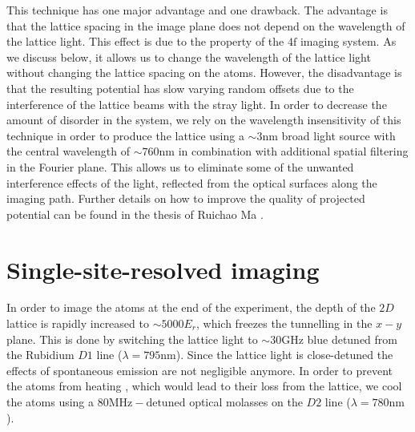 This technique has one major advantage and one drawback. The advantage is that the lattice spacing in the image plane does not depend on the wavelength of the lattice light. This effect is due to the property of the $4\mathrm{f}$ imaging system. As we discuss below, it allows us to change the wavelength of the lattice light without changing the lattice spacing on the atoms. However, the disadvantage is that the resulting potential has slow varying random offsets due to the interference of the lattice beams with the stray light. In order to decrease the amount of disorder in the system, we rely on the wavelength insensitivity of this technique in order to produce the lattice using a $\sim 3\mathrm{nm}$ broad light source with the central wavelength of $\sim 760\mathrm{nm}$ in combination with additional spatial filtering in the Fourier plane. This allows us to eliminate some of the unwanted interference effects of the light, reflected from the optical surfaces along the imaging path. Further details on how to improve the quality of projected potential can be found in the thesis of Ruichao Ma \cite{MaThesis}.

\section{Single-site-resolved imaging}
In order to image the atoms at the end of the experiment, the depth of the $2D$ lattice is rapidly increased to $\sim 5000 E_r$, which freezes the tunnelling in the $x-y$ plane. This is done by switching the lattice light to $\sim 30\mathrm{GHz}$ blue detuned from the Rubidium $D1$ line ($\lambda = 795\mathrm{nm}$). Since the lattice light is close-detuned the effects of spontaneous emission are not negligible anymore. In order to prevent the atoms from heating \cite{Gerbier2010,Pichler2010}, which would lead to their loss from the lattice, we cool the atoms using a $80\mathrm{MHz-detuned}$ optical molasses on the $D2$ line ($\lambda = 780\mathrm{nm}$). 

